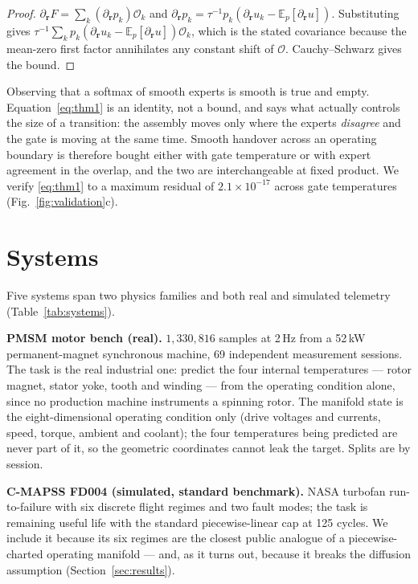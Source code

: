 \documentclass[11pt]{article}
\newcommand{\rr}{\bm{r}}
\begin{document}
\begin{proof}
$\partial_{\rr} F=\sum_k(\partial_{\rr} p_k)\mathcal{O}_k$ and
$\partial_{\rr} p_k=\tau^{-1}p_k(\partial_{\rr} u_k-\mathbb{E}_p[\partial_{\rr} u])$.
Substituting gives $\tau^{-1}\sum_k p_k(\partial_{\rr} u_k -
\mathbb{E}_p[\partial_{\rr} u])\mathcal{O}_k$, which is the stated covariance
because the mean-zero first factor annihilates any constant shift of
$\mathcal{O}$. Cauchy--Schwarz gives the bound.
\end{proof}

Observing that a softmax of smooth experts is smooth is true and empty.
Equation~\eqref{eq:thm1} is an identity, not a bound, and says what actually
controls the size of a transition: the assembly moves only where the experts
\emph{disagree} and the gate is moving at the same time. Smooth handover across
an operating boundary is therefore bought either with gate temperature or with
expert agreement in the overlap, and the two are interchangeable at fixed
product. We verify \eqref{eq:thm1} to a maximum residual of
$2.1\times10^{-17}$ across gate temperatures (Fig.~\ref{fig:validation}c).

\section{Systems}
\label{sec:systems}

Five systems span two physics families and both real and simulated telemetry
(Table~\ref{tab:systems}).

\textbf{PMSM motor bench (real).} $1{,}330{,}816$ samples at 2\,Hz from a
52\,kW permanent-magnet synchronous machine, 69 independent measurement
sessions. The task is the real industrial one: predict the four internal
temperatures --- rotor magnet, stator yoke, tooth and winding --- from the
operating condition alone, since no production machine instruments a spinning
rotor. The manifold state is the eight-dimensional operating condition only
(drive voltages and currents, speed, torque, ambient and coolant); the four
temperatures being predicted are never part of it, so the geometric coordinates
cannot leak the target. Splits are by session.

\textbf{C-MAPSS FD004 (simulated, standard benchmark).} NASA turbofan
run-to-failure with six discrete flight regimes and two fault modes; the task
is remaining useful life with the standard piecewise-linear cap at 125 cycles.
We include it because its six regimes are the closest public analogue of a
piecewise-charted operating manifold --- and, as it turns out, because it
breaks the diffusion assumption (Section~\ref{sec:results}).
\end{document}
